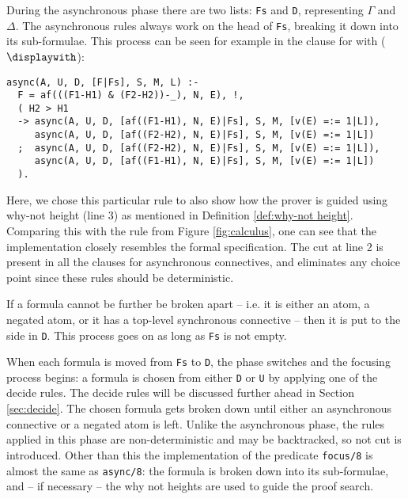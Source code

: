 During the asynchronous phase there are two lists: \texttt{Fs} and \texttt{D}, representing $\Gamma$ and $\Delta$.
The asynchronous rules always work on the head of \texttt{Fs}, breaking it down into its sub-formulae.
This process can be seen for example in the clause for with ($\displaywith$):
\begin{verbatim}
async(A, U, D, [F|Fs], S, M, L) :-
  F = af(((F1-H1) & (F2-H2))-_), N, E), !,
  ( H2 > H1	
  -> async(A, U, D, [af((F1-H1), N, E)|Fs], S, M, [v(E) =:= 1|L]), 
     async(A, U, D, [af((F2-H2), N, E)|Fs], S, M, [v(E) =:= 1|L]) 
  ;  async(A, U, D, [af((F2-H2), N, E)|Fs], S, M, [v(E) =:= 1|L]),
     async(A, U, D, [af((F1-H1), N, E)|Fs], S, M, [v(E) =:= 1|L])
  ).
\end{verbatim}
Here, we chose this particular rule to also show how the prover is guided using why-not height (line 3) as mentioned in Definition \ref{def:why-not height}.
Comparing this with the \derRule{\displaywith} rule from Figure \ref{fig:calculus}, one can see that the implementation closely resembles the formal specification.
The cut at line 2 is present in all the clauses for asynchronous connectives, and eliminates any choice point since these rules should be deterministic.

If a formula cannot be further be broken apart -- i.e. it is either an atom, a negated atom, or it has a top-level synchronous connective -- then it is put to the side in \texttt{D}.
This process goes on as long as \texttt{Fs} is not empty.

When each formula is moved from \texttt{Fs} to \texttt{D}, the phase switches and the focusing process begins: a formula is chosen from either \texttt{D} or \texttt{U} by applying one of the decide rules.
The decide rules will be discussed further ahead in Section \ref{sec:decide}.
The chosen formula gets broken down until either an asynchronous connective or a negated atom is left. 
Unlike the asynchronous phase, the rules applied in this phase are non-deterministic and may be backtracked, so not cut is introduced.
Other than this the implementation of the predicate \texttt{focus/8} is almost the same as \texttt{async/8}: the formula is broken down into its sub-formulae, and -- if necessary -- the why not heights are used to guide the proof search.

